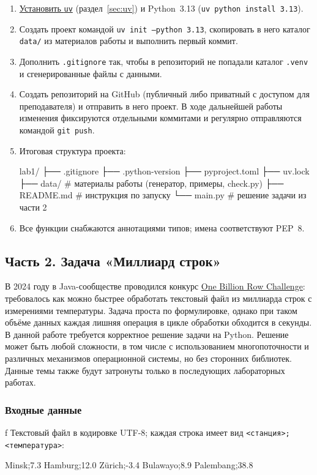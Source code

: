 \documentclass[11pt,a4paper]{article}
\newcommand{\code}[1]{\texttt{#1}}
\begin{document}
\begin{enumerate}
  \item \hyperref[sec:uv-install]{Установить \code{uv}} (раздел~\ref{sec:uv}) и Python~3.13 (\code{uv python install 3.13}).
  \item Создать проект командой \code{uv init --python 3.13}, скопировать в него каталог \code{data/}
        из материалов работы и выполнить первый коммит.
  \item Дополнить \code{.gitignore} так, чтобы в репозиторий не попадали каталог \code{.venv}
        и сгенерированные файлы с данными.
  \item Создать репозиторий на GitHub (публичный либо приватный с доступом для преподавателя)
        и отправить в него проект. В ходе дальнейшей работы изменения фиксируются
        отдельными коммитами и регулярно отправляются командой \code{git push}.
  \item Итоговая структура проекта:
\begin{plaintext}
lab1/
├── .gitignore
├── .python-version
├── pyproject.toml
├── uv.lock
├── data/              # материалы работы (генератор, примеры, check.py)
├── README.md          # инструкция по запуску
└── main.py            # решение задачи из части 2
\end{plaintext}
  \item Все функции снабжаются аннотациями типов; имена соответствуют PEP~8.
\end{enumerate}

\subsection{Часть 2. Задача «Миллиард строк»}

В 2024 году в Java-сообществе проводился конкурс
\href{https://github.com/gunnarmorling/1brc}{One Billion Row Challenge}: требовалось как можно
быстрее обработать текстовый файл из миллиарда строк с измерениями температуры. Задача проста
по формулировке, однако при таком объёме данных каждая лишняя операция в цикле обработки
обходится в секунды. В данной работе требуется корректное решение задачи на Python.
Решение может быть любой сложности, в том числе с использованием многопоточности и различных механизмов
операционной системы, но без сторонних библиотек. Данные темы также будут затронуты только в последующих
лабораторных работах.

\subsubsection*{Входные данные}
f
Текстовый файл в кодировке UTF-8; каждая строка имеет вид \code{<станция>;<температура>}:
\begin{plaintext}
Minsk;7.3
Hamburg;12.0
Zürich;-3.4
Bulawayo;8.9
Palembang;38.8
\end{plaintext}
\end{document}
